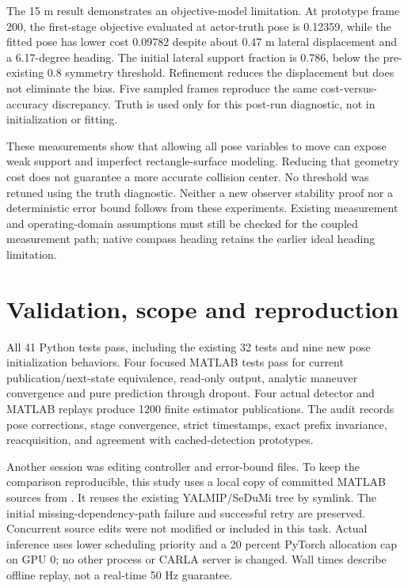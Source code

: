 \documentclass[11pt]{article}
\begin{document}
The 15 m result demonstrates an objective-model limitation. At prototype frame
200, the first-stage objective evaluated at actor-truth pose is 0.12359, while
the fitted pose has lower cost 0.09782 despite about 0.47 m lateral displacement
and a 6.17-degree heading. The initial lateral support fraction is 0.786, below
the pre-existing 0.8 symmetry threshold. Refinement reduces the displacement
but does not eliminate the bias. Five sampled frames reproduce the same
cost-versus-accuracy discrepancy. Truth is used only for this post-run
diagnostic, not in initialization or fitting.

These measurements show that allowing all pose variables to move can expose
weak support and imperfect rectangle-surface modeling. Reducing that geometry
cost does not guarantee a more accurate collision center. No threshold was
retuned using the truth diagnostic. Neither a new observer stability proof nor
a deterministic error bound follows from these experiments. Existing
measurement and operating-domain assumptions must still be checked for the
coupled measurement path; native compass heading retains the earlier ideal
heading limitation.

\section{Validation, scope and reproduction}
All 41 Python tests pass, including the existing 32 tests and nine new pose
initialization behaviors. Four focused MATLAB tests pass for current
publication/next-state equivalence, read-only output, analytic maneuver
convergence and pure prediction through dropout. Four actual detector and
MATLAB replays produce 1200 finite estimator publications. The audit records
pose corrections, stage convergence, strict timestamps, exact prefix
invariance, reacquisition, and agreement with cached-detection prototypes.

Another session was editing controller and error-bound files. To keep the
comparison reproducible, this study uses a local copy of committed MATLAB
sources from . It reuses the
existing YALMIP/SeDuMi tree by symlink. The initial missing-dependency-path
failure and successful retry are preserved. Concurrent source edits were not
modified or included in this task. Actual inference uses lower scheduling
priority and a 20 percent PyTorch allocation cap on GPU 0; no other process or
CARLA server is changed. Wall times describe offline replay, not a real-time
50 Hz guarantee.
\end{document}
